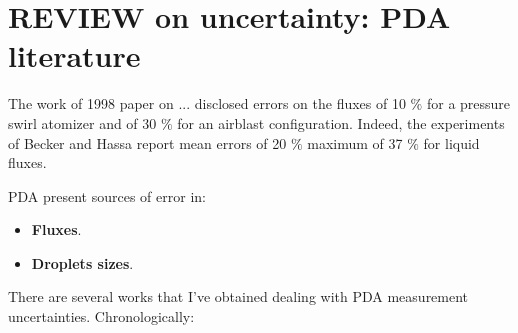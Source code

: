 \section*{REVIEW on uncertainty: PDA literature}

The work of 1998 paper on ... disclosed errors on the fluxes of 10 $\%$ for a pressure swirl atomizer and of 30 $\%$ for an airblast configuration. Indeed, the experiments of Becker and Hassa report mean errors of 20 $\%$ maximum of 37 $\%$ for liquid fluxes.

PDA present sources of error in:

\begin{itemize}

	\item \textbf{Fluxes}.
	
	\item \textbf{Droplets sizes}. 

\end{itemize}

There are several works that I've obtained dealing with PDA measurement uncertainties. Chronologically:

